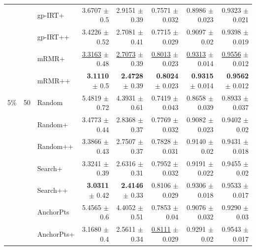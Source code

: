 \begin{longtable}{llp{}rrrrr}
 &  & gp-IRT+ & 3.6707 {\scriptsize $\pm$ 0.5} & 2.9151 {\scriptsize $\pm$ 0.39} & 0.7571 {\scriptsize $\pm$ 0.032} & 0.8986 {\scriptsize $\pm$ 0.023} & 0.9323 {\scriptsize $\pm$ 0.021} \\
 &  & gp-IRT++ & 3.4226 {\scriptsize $\pm$ 0.52} & 2.7081 {\scriptsize $\pm$ 0.41} & 0.7715 {\scriptsize $\pm$ 0.029} & 0.9097 {\scriptsize $\pm$ 0.02} & 0.9398 {\scriptsize $\pm$ 0.019} \\
 &  & mRMR+ & \underline{3.3163} {\scriptsize $\pm$ 0.48} & \underline{2.7073} {\scriptsize $\pm$ 0.39} & \underline{0.8013} {\scriptsize $\pm$ 0.023} & \underline{0.9313} {\scriptsize $\pm$ 0.014} & \underline{0.9556} {\scriptsize $\pm$ 0.012} \\
 &  & mRMR++ & \textbf{3.1110} {\scriptsize $\pm$ 0.5} & \textbf{2.4728} {\scriptsize $\pm$ 0.39} & \textbf{0.8024} {\scriptsize $\pm$ 0.023} & \textbf{0.9315} {\scriptsize $\pm$ 0.014} & \textbf{0.9562} {\scriptsize $\pm$ 0.012} \\
\midrule
5\% & 50 & Random & 5.4819 {\scriptsize $\pm$ 0.72} & 4.3931 {\scriptsize $\pm$ 0.61} & 0.7419 {\scriptsize $\pm$ 0.043} & 0.8658 {\scriptsize $\pm$ 0.039} & 0.8933 {\scriptsize $\pm$ 0.037} \\
 &  & Random+ & 3.4773 {\scriptsize $\pm$ 0.44} & 2.8368 {\scriptsize $\pm$ 0.37} & 0.7769 {\scriptsize $\pm$ 0.032} & 0.9082 {\scriptsize $\pm$ 0.023} & 0.9402 {\scriptsize $\pm$ 0.02} \\
 &  & Random++ & 3.3866 {\scriptsize $\pm$ 0.43} & 2.7507 {\scriptsize $\pm$ 0.37} & 0.7828 {\scriptsize $\pm$ 0.031} & 0.9140 {\scriptsize $\pm$ 0.02} & 0.9431 {\scriptsize $\pm$ 0.018} \\
 &  & Search+ & 3.3241 {\scriptsize $\pm$ 0.39} & 2.6316 {\scriptsize $\pm$ 0.31} & 0.7952 {\scriptsize $\pm$ 0.032} & 0.9191 {\scriptsize $\pm$ 0.022} & 0.9455 {\scriptsize $\pm$ 0.02} \\
 &  & Search++ & \textbf{3.0311} {\scriptsize $\pm$ 0.42} & \textbf{2.4146} {\scriptsize $\pm$ 0.33} & 0.8106 {\scriptsize $\pm$ 0.029} & 0.9306 {\scriptsize $\pm$ 0.018} & 0.9533 {\scriptsize $\pm$ 0.017} \\
 &  & AnchorPts & 5.4565 {\scriptsize $\pm$ 0.6} & 4.4052 {\scriptsize $\pm$ 0.51} & 0.7853 {\scriptsize $\pm$ 0.04} & 0.9076 {\scriptsize $\pm$ 0.032} & 0.9290 {\scriptsize $\pm$ 0.03} \\
 &  & AnchorPts+ & 3.1680 {\scriptsize $\pm$ 0.4} & 2.5611 {\scriptsize $\pm$ 0.34} & \underline{0.8111} {\scriptsize $\pm$ 0.029} & 0.9291 {\scriptsize $\pm$ 0.02} & 0.9543 {\scriptsize $\pm$ 0.017} \\

\end{longtable}
